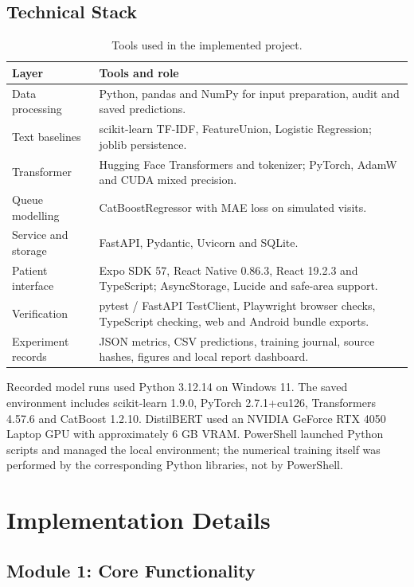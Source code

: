 \documentclass{tietreport}
\begin{document}
\subsection{Technical Stack}
\begin{table}[H]\centering\small
\begin{tabularx}{\textwidth}{p{}Y}
\toprule Layer & Tools and role \\ \midrule
Data processing & Python, pandas and NumPy for input preparation, audit and saved predictions. \\
Text baselines & scikit-learn TF-IDF, FeatureUnion, Logistic Regression; joblib persistence. \\
Transformer & Hugging Face Transformers and tokenizer; PyTorch, AdamW and CUDA mixed precision. \\
Queue modelling & CatBoostRegressor with MAE loss on simulated visits. \\
Service and storage & FastAPI, Pydantic, Uvicorn and SQLite. \\
Patient interface & Expo SDK 57, React Native 0.86.3, React 19.2.3 and TypeScript; AsyncStorage, Lucide and safe-area support. \\
Verification & pytest / FastAPI TestClient, Playwright browser checks, TypeScript checking, web and Android bundle exports. \\
Experiment records & JSON metrics, CSV predictions, training journal, source hashes, figures and local report dashboard. \\
\bottomrule
\end{tabularx}
\caption{Tools used in the implemented project.}
\end{table}

Recorded model runs used Python 3.12.14 on Windows 11. The saved environment includes scikit-learn 1.9.0, PyTorch 2.7.1+cu126, Transformers 4.57.6 and CatBoost 1.2.10. DistilBERT used an NVIDIA GeForce RTX 4050 Laptop GPU with approximately 6 GB VRAM. PowerShell launched Python scripts and managed the local environment; the numerical training itself was performed by the corresponding Python libraries, not by PowerShell.

\section{Implementation Details}
\subsection{Module 1: Core Functionality}
\end{document}
